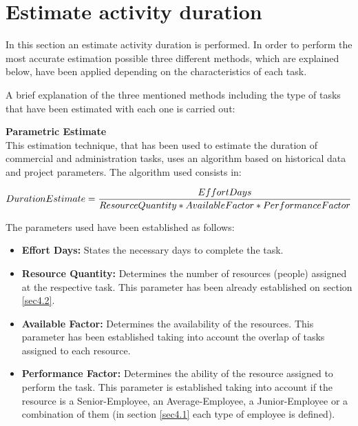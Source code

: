 \chapter{Estimate activity duration}

In this section an estimate activity duration is performed. In order to perform the most accurate estimation possible three different methods, which are explained below, have been applied depending on the characteristics of each task. 

A brief explanation of the three mentioned methods including the type of tasks that have been estimated with each one is carried out:

\textbf{Parametric Estimate} \\
This estimation technique, that has been used to estimate the duration of commercial and administration tasks, uses an algorithm based on historical data and project parameters. The algorithm used consists in: 

\begin{equation}
\centering
\notag Duration Estimate=\frac{Effort Days}{Resource Quantity * Available Factor * Performance Factor}
\end{equation}

The parameters used have been established as follows:

\begin{itemize}
	
	\item \textbf{Effort Days:} States the necessary days to complete the task.
	
	\item \textbf{Resource Quantity:} Determines the number of resources (people) assigned at the respective task. This parameter has been already established on section \ref{sec4.2}.
	
	\item \textbf{Available Factor:} Determines the availability of the resources. This parameter has been established taking into account the overlap of tasks assigned to each resource.

	\item \textbf{Performance Factor:} Determines the ability of the resource assigned to perform the task. This parameter is established taking into account if the resource is a Senior-Employee, an Average-Employee, a Junior-Employee or a combination of them (in section \ref{sec4.1} each type of employee is defined).
	
\end{itemize} 

